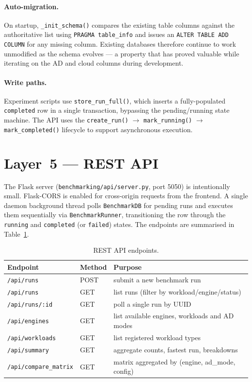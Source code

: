 \paragraph{Auto-migration.}
On startup, \texttt{\_init\_schema()} compares the existing table columns
against the authoritative list using \texttt{PRAGMA table\_info} and issues an
\texttt{ALTER TABLE ADD COLUMN} for any missing column. Existing databases
therefore continue to work unmodified as the schema evolves --- a property that
has proved valuable while iterating on the AD and cloud columns during
development.

\paragraph{Write paths.}
Experiment scripts use \texttt{store\_run\_full()}, which inserts a fully-populated
\texttt{completed} row in a single transaction, bypassing the pending/running
state machine. The API uses the
\texttt{create\_run()} $\rightarrow$ \texttt{mark\_running()} $\rightarrow$
\texttt{mark\_completed()} lifecycle to support asynchronous execution.

\section{Layer~5 --- REST API}
\label{sec:api-layer}

The Flask server (\texttt{benchmarking/api/server.py}, port 5050) is intentionally
small. Flask-CORS is enabled for cross-origin requests from the frontend. A single
daemon background thread polls \texttt{BenchmarkDB} for pending runs and executes
them sequentially via \texttt{BenchmarkRunner}, transitioning the row through the
\texttt{running} and \texttt{completed} (or \texttt{failed}) states. The endpoints
are summarised in Table~\ref{tab:api-endpoints}.

\begin{table}[h]
\centering
\caption{REST API endpoints.}
\label{tab:api-endpoints}
\begin{tabular}{lll}
\hline
Endpoint & Method & Purpose \\
\hline
\texttt{/api/runs} & POST & submit a new benchmark run \\
\texttt{/api/runs} & GET & list runs (filter by workload/engine/status) \\
\texttt{/api/runs/:id} & GET & poll a single run by UUID \\
\texttt{/api/engines} & GET & list available engines, workloads and AD modes \\
\texttt{/api/workloads} & GET & list registered workload types \\
\texttt{/api/summary} & GET & aggregate counts, fastest run, breakdowns \\
\texttt{/api/compare\_matrix} & GET & matrix aggregated by (engine, ad\_mode, config) \\
\hline
\end{tabular}
\end{table}

